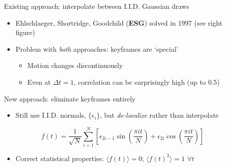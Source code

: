 \documentclass[final,t]{beamer}\usepackage[]{graphicx}\usepackage[]{color}
\newenvironment{knitrout}{}{} %
\begin{document}
\begin{frame}[fragile]
\begin{columns}[T,onlytextwidth]
\begin{column}{.325\linewidth}
{\begin{block}{Existing approach:
        interpolate between I.I.D. Gaussian draws}
\begin{knitrout}
\end{knitrout}

        \begin{itemize}
          \item Ehlschlaeger, Shortridge, Goodchild (\textbf{ESG})
            solved in 1997 (see right figure)
          \item Problem with \textit{both} approaches: keyframes are `special'
            \begin{itemize}
              \item Motion changes discontinuously
              \item Even at $\Delta t = 1$, correlation can be surprisingly high
                (up to 0.5)
            \end{itemize}
        \end{itemize}
      \end{block}

      \vfill

      \begin{block}{New approach: eliminate keyframes entirely}
        \vspace{-0.5em}
        \begin{itemize}
          \item Still use I.I.D. normals, $\{\epsilon_i\}$,
            but \textit{de-localize} rather than interpolate
        \end{itemize}
        \begin{equation*}
          f(t) = \frac{1}{\sqrt{N}} \sum_{i=1}^N
          \left[
            \epsilon_{2i-1}\sin\left(\frac{\pi i t}{N}\right) +
            \epsilon_{2i}  \cos\left(\frac{\pi i t}{N}\right)
          \right]
        \end{equation*}
        \begin{itemize}
          \item Correct statistical properties: 
            $\langle f(t) \rangle = 0$; \hspace{1em}
            $\langle f(t)^2 \rangle = 1$ \hspace{1em}
            $\forall t$
        \end{itemize}
      \end{block}

      }%
    \end{column}

    \begin{column}{.325\linewidth}


\end{column}
\end{columns}
\end{frame}
\end{document}

